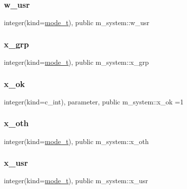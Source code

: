 \mbox{\label{namespacem__system_ace39a3c0b26d21381c2956b78a8822d5}} 
\subsubsection{\texorpdfstring{w\+\_\+usr}{w\_usr}}
{\footnotesize\ttfamily integer(kind=\mbox{\hyperlink{namespacem__system_abdb5cc27c945379d844db4830d499050}{mode\+\_\+t}}), public m\+\_\+system\+::w\+\_\+usr}

\mbox{\label{namespacem__system_ae405a76caed1088a151c437d66d80eb0}} 
\subsubsection{\texorpdfstring{x\+\_\+grp}{x\_grp}}
{\footnotesize\ttfamily integer(kind=\mbox{\hyperlink{namespacem__system_abdb5cc27c945379d844db4830d499050}{mode\+\_\+t}}), public m\+\_\+system\+::x\+\_\+grp}

\mbox{\label{namespacem__system_a0eca0d5b431ad6fbde6f40407550e7aa}} 
\subsubsection{\texorpdfstring{x\+\_\+ok}{x\_ok}}
{\footnotesize\ttfamily integer(kind=c\+\_\+int), parameter, public m\+\_\+system\+::x\+\_\+ok =1}

\mbox{\label{namespacem__system_a5863ec37dc7d85f9c3f20cc511d26bb4}} 
\subsubsection{\texorpdfstring{x\+\_\+oth}{x\_oth}}
{\footnotesize\ttfamily integer(kind=\mbox{\hyperlink{namespacem__system_abdb5cc27c945379d844db4830d499050}{mode\+\_\+t}}), public m\+\_\+system\+::x\+\_\+oth}

\mbox{\label{namespacem__system_a450a3fddafad75b241f370b47b17d97c}} 
\subsubsection{\texorpdfstring{x\+\_\+usr}{x\_usr}}
{\footnotesize\ttfamily integer(kind=\mbox{\hyperlink{namespacem__system_abdb5cc27c945379d844db4830d499050}{mode\+\_\+t}}), public m\+\_\+system\+::x\+\_\+usr}

